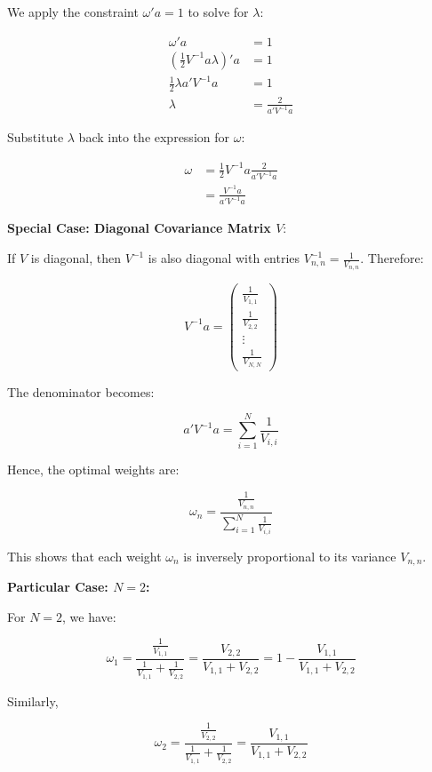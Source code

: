 \documentclass[12pt]{article}
\begin{document}
We apply the constraint \( \omega' a = 1 \) to solve for \( \lambda \):

\begin{align*}
\omega' a &= 1\\
\left( \frac{1}{2} V^{-1} a \lambda \right)' a &= 1\\
\frac{1}{2} \lambda a' V^{-1} a &= 1\\
\lambda &= \frac{2}{a' V^{-1} a}
\end{align*}

Substitute \( \lambda \) back into the expression for \( \omega \):

\begin{align*}
\omega &= \frac{1}{2} V^{-1} a \frac{2}{a' V^{-1} a}\\
&= \frac{V^{-1} a}{a' V^{-1} a}
\end{align*}

\smallskip

\textbf{Special Case: Diagonal Covariance Matrix \( V \)}:

   If \( V \) is diagonal, then \( V^{-1} \) is also diagonal with entries \( V^{-1}_{n,n} = \frac{1}{V_{n,n}} \). Therefore:

   \[
   V^{-1} a = \begin{pmatrix} \frac{1}{V_{1,1}} \\ \frac{1}{V_{2,2}} \\ \vdots \\ \frac{1}{V_{N,N}} \end{pmatrix}
   \]

   The denominator becomes:

   \[
   a' V^{-1} a = \sum_{i=1}^{N} \frac{1}{V_{i,i}}
   \]

   Hence, the optimal weights are:

   \[
   \omega_n = \frac{\frac{1}{V_{n,n}}}{\sum_{i=1}^{N} \frac{1}{V_{i,i}}}
   \]

   This shows that each weight \( \omega_n \) is inversely proportional to its variance \( V_{n,n} \).

\textbf{Particular Case: \( N = 2 \):}

   For \( N = 2 \), we have:

   \[
   \omega_1 = \frac{\frac{1}{V_{1,1}}}{\frac{1}{V_{1,1}} + \frac{1}{V_{2,2}}} = \frac{V_{2,2}}{V_{1,1} + V_{2,2}} = 1 - \frac{V_{1,1}}{V_{1,1} + V_{2,2}}
   \]

   Similarly,

   \[
   \omega_2 = \frac{\frac{1}{V_{2,2}}}{\frac{1}{V_{1,1}} + \frac{1}{V_{2,2}}} = \frac{V_{1,1}}{V_{1,1} + V_{2,2}}
   \]
\end{document}
